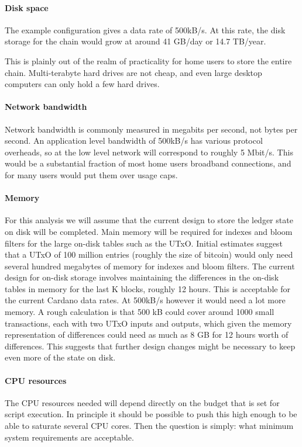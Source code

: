 \documentclass[11pt,a4paper]{article}
\begin{document}
\paragraph{Disk space}
The example configuration gives a data rate of 500kB/s. At this rate, the disk
storage for the chain would grow at around 41 GB/day or 14.7 TB/year.

This is plainly out of the realm of practicality for home users to store the
entire chain. Multi-terabyte hard drives are not cheap, and even large desktop
computers can only hold a few hard drives.

\paragraph{Network bandwidth}
Network bandwidth is commonly measured in megabits per second, not bytes per
second. An application level bandwidth of 500kB/s has various protocol
overheads, so at the low level network will correspond to roughly 5 Mbit/s.
This would be a substantial fraction of most home users broadband connections,
and for many users would put them over usage caps.

\paragraph{Memory}
For this analysis we will assume that the current design to store the ledger
state on disk will be completed. Main memory will be required for indexes and
bloom filters for the large on-disk tables such as the UTxO. Initial estimates
suggest that a UTxO of 100 million entries (roughly the size of bitcoin) would
only need several hundred megabytes of memory for indexes and bloom filters.
The current design for on-disk storage involves maintaining the differences in
the on-disk tables in memory for the last K blocks, roughly 12 hours. This is
acceptable for the current Cardano data rates. At 500kB/s however it would need
a lot more memory. A rough calculation is that 500 kB could cover around 1000
small transactions, each with two UTxO inputs and outputs, which given the
memory representation of differences could need as much as 8 GB for 12 hours
worth of differences. This suggests that further design changes might be
necessary to keep even more of the state on disk.

\paragraph{CPU resources}
The CPU resources needed will depend directly on the budget that is set for
script execution. In principle it should be possible to push this high enough
to be able to saturate several CPU cores. Then the question is simply: what
minimum system requirements are acceptable.
\end{document}
